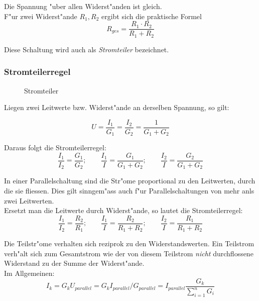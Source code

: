 \documentclass[german, 10pt, a4paper, headsepline]{scrreprt}
\theoremstyle{remark}
\begin{document}
Die Spannung "uber allen Widerst"anden ist gleich.\\

F"ur zwei Widerst"ande $R_1, R_2$ ergibt sich die praktische Formel
\begin{displaymath}
	R_{ges} = \frac{R_1 \cdotp R_2}{R_1 + R_2}
\end{displaymath}

Diese Schaltung wird auch als \textit{Stromteiler} bezeichnet.

\subsubsection{Stromteilerregel}

\begin{figure}[hbt]
 
 \centerline{\box\graph}
 \caption{Stromteiler}
 \label{stromteiler}
\end{figure}

Liegen zwei Leitwerte bzw. Widerst"ande an derselben Spannung, so gilt:

\begin{displaymath}
	U=\frac{I_1}{G_1}=\frac{I_2}{G_2}=\frac{1}{G_1+G_2}
\end{displaymath}

Daraus folgt die Stromteilerregel:
\begin{displaymath}
	\frac{I_1}{I_2}=\frac{G_1}{G_2};\qquad \frac{I_1}{I}=\frac{G_1}{G_1+G_2};\qquad \frac{I_2}{I}=\frac{G_2}{G_1+G_2}
\end{displaymath}

In einer Parallelschaltung sind die Str"ome proportional zu den Leitwerten, durch die sie fliessen. Dies gilt sinngem"ass auch f"ur Parallelschaltungen von mehr anls zwei Leitwerten.\\

Ersetzt man die Leitwerte durch Widerst"ande, so lautet die Stromteilerregel:
\begin{displaymath}
	\frac{I_1}{I_2}=\frac{R_2}{R_1};\qquad \frac{I_1}{I}=\frac{R_2}{R_1+R_2};\qquad \frac{I_2}{I}=\frac{R_1}{R_1+R_2}
\end{displaymath}

Die Teilstr"ome verhalten sich reziprok zu den Widerstandswerten. Ein Teilstrom verh"alt sich zum Gesamtstrom wie der von diesem Teilstrom \textit{nicht} durchflossene Widerstand zu der Summe der Widerst"ande.\\

Im Allgemeinen:
\begin{displaymath}
	I_k = G_k U_{parallel} = G_k I_{parallel} / G_{parallel} = I_{parallel}\frac{G_k}{\sum^n_{i=1}G_i}
\end{displaymath}
\end{document}
